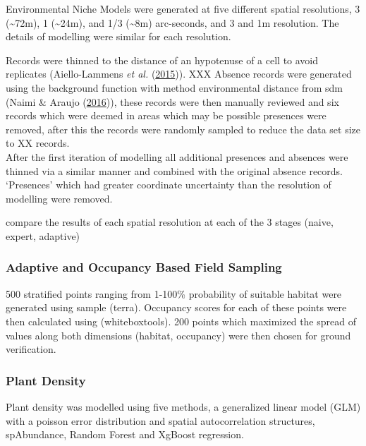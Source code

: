 \documentclass[
]{article}
\begin{document}
Environmental Niche Models were generated at five different spatial
resolutions, 3 (\textasciitilde72m), 1 (\textasciitilde24m), and 1/3
(\textasciitilde8m) arc-seconds, and 3 and 1m resolution. The details of
modelling were similar for each resolution.

Records were thinned to the distance of an hypotenuse of a cell to avoid
replicates (Aiello-Lammens \emph{et al.}
(\protect\hyperlink{ref-aeillo2015spthin}{2015})). XXX Absence records
were generated using the background function with method environmental
distance from sdm (Naimi \& Araujo
(\protect\hyperlink{ref-naimi2016sdm}{2016})), these records were then
manually reviewed and six records which were deemed in areas which may
be possible presences were removed, after this the records were randomly
sampled to reduce the data set size to XX records.\\
After the first iteration of modelling all additional presences and
absences were thinned via a similar manner and combined with the
original absence records. `Presences' which had greater coordinate
uncertainty than the resolution of modelling were removed.

compare the results of each spatial resolution at each of the 3 stages
(naive, expert, adaptive)

\hypertarget{adaptive-and-occupancy-based-field-sampling}{%
\subsubsection{Adaptive and Occupancy Based Field
Sampling}\label{adaptive-and-occupancy-based-field-sampling}}

500 stratified points ranging from 1-100\% probability of suitable
habitat were generated using sample (terra). Occupancy scores for each
of these points were then calculated using (whiteboxtools). 200 points
which maximized the spread of values along both dimensions (habitat,
occupancy) were then chosen for ground verification.

\hypertarget{plant-density}{%
\subsubsection{Plant Density}\label{plant-density}}

Plant density was modelled using five methods, a generalized linear
model (GLM) with a poisson error distribution and spatial
autocorrelation structures, spAbundance, Random Forest and XgBoost
regression.
\end{document}
